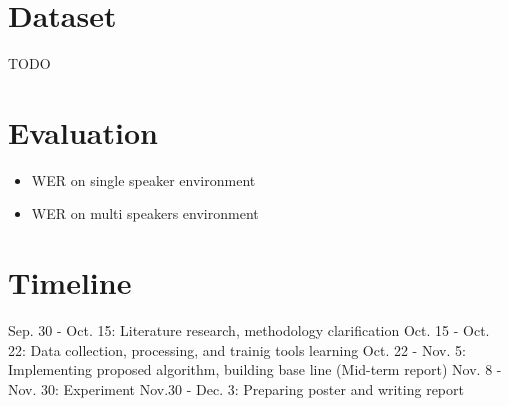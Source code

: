 \documentclass{article}%
\begin{document}
\section{Dataset}
TODO
\section{Evaluation}
\begin{itemize}
    \item WER on single speaker environment
    \item WER on multi speakers environment
\end{itemize}
\section{Timeline}
Sep. 30 - Oct. 15: Literature research, methodology clarification
Oct. 15 - Oct. 22: Data collection, processing, and trainig tools learning
Oct. 22 - Nov. 5: Implementing proposed algorithm, building base line (Mid-term report)
Nov. 8 - Nov. 30: Experiment 
Nov.30 - Dec. 3: Preparing poster and writing report 


\end{document}
